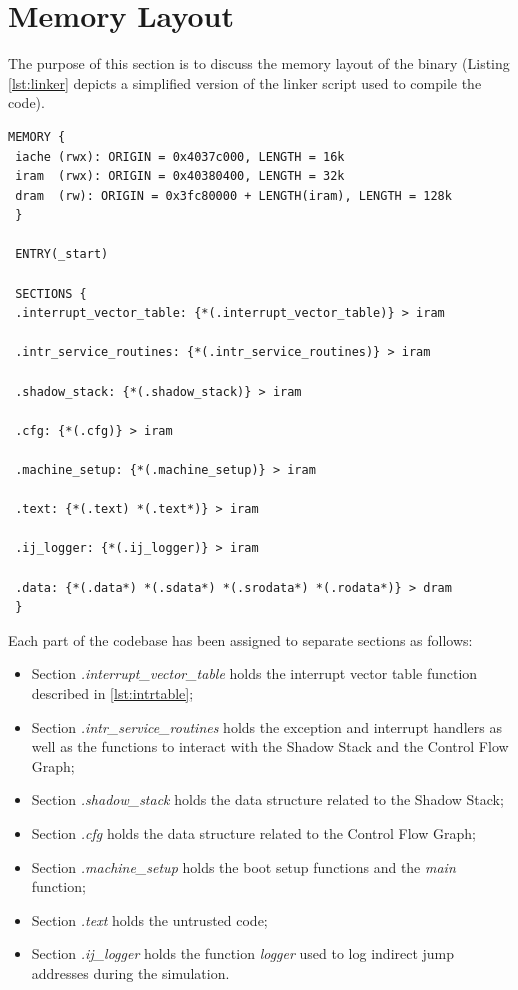 \section{Memory Layout}
\label{sec:layout}

The purpose of this section is to discuss the memory layout of the binary (Listing
\ref{lst:linker} depicts a simplified version of the linker script used to
compile the code). \\
\begin{lstlisting}[style=CStyle, caption= Simplified linker script, label={lst:linker}]
 MEMORY {
 iache (rwx): ORIGIN = 0x4037c000, LENGTH = 16k
 iram  (rwx): ORIGIN = 0x40380400, LENGTH = 32k
 dram  (rw): ORIGIN = 0x3fc80000 + LENGTH(iram), LENGTH = 128k
 }

 ENTRY(_start)

 SECTIONS {
 .interrupt_vector_table: {*(.interrupt_vector_table)} > iram

 .intr_service_routines: {*(.intr_service_routines)} > iram

 .shadow_stack: {*(.shadow_stack)} > iram

 .cfg: {*(.cfg)} > iram

 .machine_setup: {*(.machine_setup)} > iram

 .text: {*(.text) *(.text*)} > iram

 .ij_logger: {*(.ij_logger)} > iram

 .data: {*(.data*) *(.sdata*) *(.srodata*) *(.rodata*)} > dram
 }
\end{lstlisting}

Each part of the codebase has been assigned to separate sections as follows:
\begin{itemize}
  \item Section \textit{.interrupt\_vector\_table} holds the interrupt vector
    table function described in \ref{lst:intrtable};

  \item Section \textit{.intr\_service\_routines} holds the exception and
    interrupt handlers as well as the functions to interact with the Shadow
    Stack and the Control Flow Graph;

  \item Section \textit{.shadow\_stack} holds the data structure related to the
    Shadow Stack;

  \item Section \textit{.cfg} holds the data structure related to the Control
    Flow Graph;

  \item Section \textit{.machine\_setup} holds the boot setup functions and the
    \textit{main} function;

  \item Section \textit{.text} holds the untrusted code;

  \item Section \textit{.ij\_logger} holds the function \textit{logger} used to log
    indirect jump addresses during the simulation.
\end{itemize}

